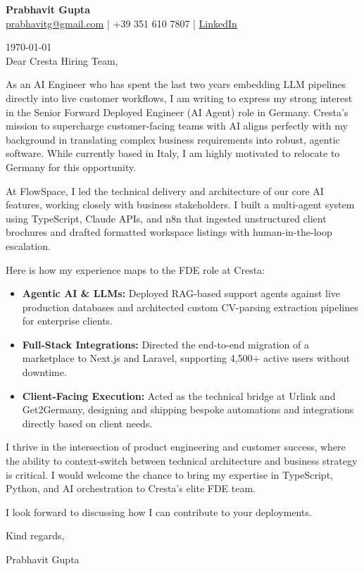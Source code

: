 \documentclass[11pt,a4paper]{article}
\begin{document}
\begin{center}
    {\Huge \textbf{Prabhavit Gupta}} \\ \vspace{0.2cm}
    \href{mailto:prabhavitg@gmail.com}{prabhavitg@gmail.com} | +39 351 610 7807 | \href{https://www.linkedin.com/in/prabhavit/}{LinkedIn}
\end{center}
\vspace{0.5cm}

\today \\

Dear Cresta Hiring Team,

As an AI Engineer who has spent the last two years embedding LLM pipelines directly into live customer workflows, I am writing to express my strong interest in the Senior Forward Deployed Engineer (AI Agent) role in Germany. Cresta's mission to supercharge customer-facing teams with AI aligns perfectly with my background in translating complex business requirements into robust, agentic software. While currently based in Italy, I am highly motivated to relocate to Germany for this opportunity.

At FlowSpace, I led the technical delivery and architecture of our core AI features, working closely with business stakeholders. I built a multi-agent system using TypeScript, Claude APIs, and n8n that ingested unstructured client brochures and drafted formatted workspace listings with human-in-the-loop escalation. 

Here is how my experience maps to the FDE role at Cresta:
\begin{itemize}
    \item \textbf{Agentic AI \& LLMs:} Deployed RAG-based support agents against live production databases and architected custom CV-parsing extraction pipelines for enterprise clients.
    \item \textbf{Full-Stack Integrations:} Directed the end-to-end migration of a marketplace to Next.js and Laravel, supporting 4,500+ active users without downtime.
    \item \textbf{Client-Facing Execution:} Acted as the technical bridge at Urlink and Get2Germany, designing and shipping bespoke automations and integrations directly based on client needs.
\end{itemize}

I thrive in the intersection of product engineering and customer success, where the ability to context-switch between technical architecture and business strategy is critical. I would welcome the chance to bring my expertise in TypeScript, Python, and AI orchestration to Cresta's elite FDE team.

I look forward to discussing how I can contribute to your deployments.

Kind regards,

Prabhavit Gupta
\end{document}
